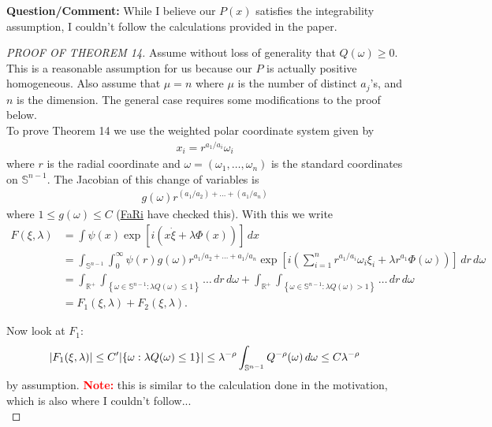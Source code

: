 \documentclass{article}
\theoremstyle{definition}
\newcommand{\lp}{\left(}
\newcommand{\rp}{\right)}
\newcommand{\lb}{\left[}
\newcommand{\rb}{\right]}
\newcommand{\lc}{\left\{}
\newcommand{\rc}{\right\}}
\begin{document}
\noindent \textbf{Question/Comment:} While I believe our $P(x)$ satisfies the integrability assumption, I couldn't follow the calculations provided in the paper. \\




\noindent \begin{proof}[PROOF OF THEOREM 14]
    Assume without loss of generality that $Q(\omega) \geq 0$. This is a reasonable assumption for us because our $P$ is actually positive homogeneous. Also assume that $\mu= n$ where $\mu$ is the number of distinct $a_j$'s, and $n$ is the dimension. The general case requires some modifications to the proof below.\\
    
    To prove Theorem 14 we use the weighted polar coordinate system given by
    \begin{align*}
        x_i = r^{a_1/a_i} \omega_i
    \end{align*}
    where $r$ is the radial coordinate and $\omega = (\omega_1,\dots,\omega_n)$ is the standard coordinates on $\mathbb{S}^{n-1}$. The Jacobian of this change of variables is \begin{align*}
        g(\omega)r^{(a_1/a_2) + \dots + (a_1/a_n)}
    \end{align*}
    where $1 \leq g(\omega) \leq C$ (\href{http://matwbn.icm.edu.pl/ksiazki/sm/sm27/sm2713.pdf}{\underline{FaRi}} have checked this). With this we write
    \begin{align*}
        F(\xi,\lambda) 
        &= \int \psi(x)\exp\lb i\lp x\dot \xi + \lambda \Phi(x) \rp \rb\,dx\\
        &= \int_{\mathbb{S}^{n-1}}\int^\infty_0 \psi(r)g(\omega)r^{a_1/a_2 +\dots+ a_1/a_n} \exp\lb i\lp \sum^n_{i=1}r^{a_1/a_i}\omega_i\xi_i  + \lambda r^{a_1}\Phi(\omega) \rp\rb \,dr\,d\omega\\
        &= 
        \int_{\mathbb{R}^+}\int_{\lc \omega \in \mathbb{S}^{n-1}: \lambda Q(\omega) \leq 1 \rc}\dots \,dr\,d\omega + 
        \int_{\mathbb{R}^+}\int_{\lc \omega \in \mathbb{S}^{n-1}: \lambda Q(\omega) > 1 \rc}\dots \,dr\,d\omega\\
        &= F_1(\xi,\lambda) + F_2(\xi,\lambda).
    \end{align*}

    Now look at $F_1$:
    \begin{align*}
        \abs{F_1(\xi,\lambda)} \leq C'\abs{\lc \omega: \lambda Q(\omega) \leq 1 \rc} \leq \lambda^{-\rho}\int_{\mathbb{S}^{n-1}}Q^{-\rho}(\omega)\,d\omega\leq C\lambda^{-\rho}
    \end{align*}
    by assumption. \textbf{\textcolor{red}{Note:}} this is similar to the calculation done in the motivation, which is also where I couldn't follow...\\
    

\end{proof}
\end{document}
